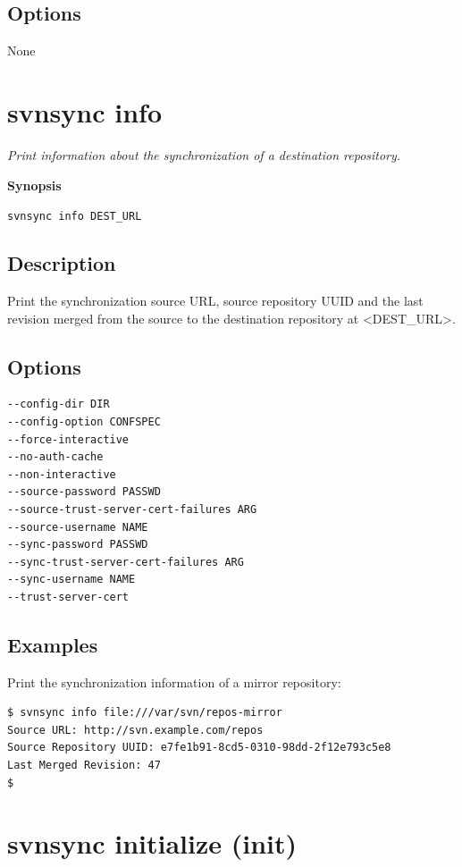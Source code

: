 \subsection{Options}

None

\section{svnsync info}\label{svn.ref.svnsync.c.info}

\emph{Print information about the synchronization of a destination
repository.}

\textbf{Synopsis}

\texttt{svnsync\ info\ DEST\_URL}

\subsection{Description}

Print the synchronization source URL, source repository UUID and the
last revision merged from the source to the destination repository at
\textless DEST\_URL\textgreater.

\subsection{Options}

\begin{verbatim}
--config-dir DIR
--config-option CONFSPEC
--force-interactive
--no-auth-cache
--non-interactive
--source-password PASSWD
--source-trust-server-cert-failures ARG
--source-username NAME
--sync-password PASSWD
--sync-trust-server-cert-failures ARG
--sync-username NAME
--trust-server-cert
\end{verbatim}

\subsection{Examples}

Print the synchronization information of a mirror repository:

\begin{verbatim}
$ svnsync info file:///var/svn/repos-mirror
Source URL: http://svn.example.com/repos
Source Repository UUID: e7fe1b91-8cd5-0310-98dd-2f12e793c5e8
Last Merged Revision: 47
$
\end{verbatim}

\section{svnsync initialize (init)}\label{svn.ref.svnsync.c.init}

